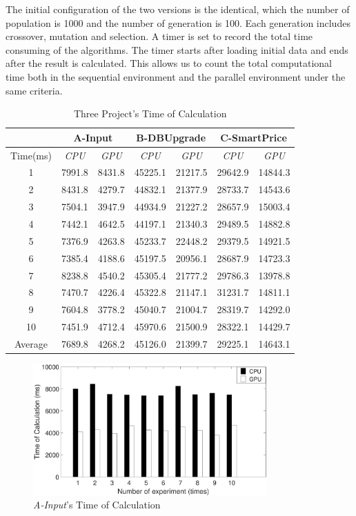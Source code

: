 The initial configuration of the two versions is the identical, which the number
of population is 1000 and the number of generation is 100. Each generation
includes crossover, mutation and selection. A timer is set to record the total
time consuming of the algorithms. The timer starts after loading initial data
and ends after the result is calculated. This allows us to count the total
computational time both in the sequential environment and the parallel
environment under the same criteria.

\begin{table}
  \centering
  \caption{Three Project's Time of Calculation}
  \label{tab:consuming}
  \begin{tabular}{ccccccc}
    \hline
      & \multicolumn{2}{c}{ A-Input } & \multicolumn{2}{c}{ B-DBUpgrade } & \multicolumn{2}{c}{ C-SmartPrice } \\
    \hline
      Time(ms) & \emph{ CPU } & \emph{ GPU } & \emph{ CPU } & \emph{ GPU } & \emph{ CPU } & \emph{ GPU }\\
    \hline
     1 & 7991.8 & 8431.8 & 45225.1 & 21217.5 & 29642.9 & 14844.3 \\
     2 & 8431.8 & 4279.7 & 44832.1 & 21377.9 & 28733.7 & 14543.6 \\
     3 & 7504.1 & 3947.9 & 44934.9 & 21227.2 & 28657.9 & 15003.4 \\
     4 & 7442.1 & 4642.5 & 44197.1 & 21340.3 & 29489.5 & 14882.8 \\
     5 & 7376.9 & 4263.8 & 45233.7 & 22448.2 & 29379.5 & 14921.5 \\
     6 & 7385.4 & 4188.6 & 45197.5 & 20956.1 & 28687.9 & 14723.3 \\
     7 & 8238.8 & 4540.2 & 45305.4 & 21777.2 & 29786.3 & 13978.8 \\
     8 & 7470.7 & 4226.4 & 45322.8 & 21147.1 & 31231.7 & 14811.1 \\
     9 & 7604.8 & 3778.2 & 45040.7 & 21004.7 & 28319.7 & 14292.0 \\
     10  & 7451.9 & 4712.4 & 45970.6 & 21500.9 & 28322.1 & 14429.7 \\
     Average & 7689.8 & 4268.2 & 45126.0 & 21399.7 & 29225.1 & 14643.1 \\
    \hline
  \end{tabular}
\end{table}

\begin{figure}[!htb]
  \centering
  \includegraphics[width=0.8\textwidth]{figures/fig_co1.eps}
  \caption{\emph{A-Input}'s Time of Calculation}
  \label{fig:co1}
\end{figure}

